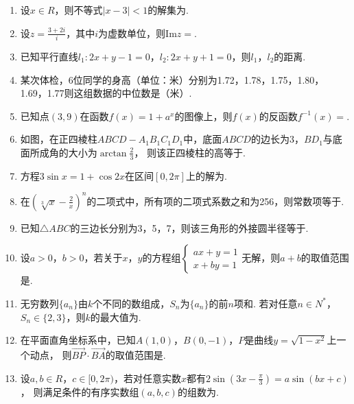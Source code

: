 \documentclass[12pt,space]{ctexart} %
\begin{document}
\begin{enumerate}[itemsep=-0.3em,topsep=0pt]

  \item 设$x\in R$，则不等式$|x-3|<1$的解集为.
  \item 设$\displaystyle{z=\frac{3+2i}{i}}$，其中$i$为虚数单位，则$\text{Im} z=$.
  \item 已知平行直线$l_1: 2x+y-1=0$，$l_2: 2x+y+1=0$，则$l_1$，$l_2$的距离.
  \item 某次体检，6位同学的身高（单位：米）分别为1.72，1.78，1.75，1.80，1.69，1.77则这组数据的中位数是（米）.
  \item 已知点$(3,9)$在函数$f(x)=1+a^x$的图像上，则$f(x)$的反函数$f^{-1}(x)=$.
  \item 如图，在正四棱柱$ABCD-A_1B_1C_1D_1$中，底面$ABCD$的边长为3，$BD_1$与底面所成角的大小为$\displaystyle{\arctan{\frac{2}{3}}}$，
        则该正四棱柱的高等于.
  \item 方程$3\sin x=1+\cos 2x$在区间$[0,2\pi]$上的解为.
  \item 在$\displaystyle{\left (\sqrt[3]{x}-\frac{2}{x}\right )^n}$的二项式中，所有项的二项式系数之和为256，则常数项等于.
  \item 已知$\triangle ABC$的三边长分别为3，5，7，则该三角形的外接圆半径等于.
  \item 设$a>0$，$b>0$，若关于$x$，$y$的方程组$\begin{cases}ax+y=1\\x+by=1\end{cases}$无解，则$a+b$的取值范围是\blank{$[2,+\infty)$}.
  \item 无穷数列$\{a_n\}$由$k$个不同的数组成，$S_n$为$\{a_n\}$的前$n$项和. 若对任意$n\in N^*$，$S_n\in \{2,3\}$，则$k$的最大值为.
  \item 在平面直角坐标系中，已知$A(1,0)$，$B(0,-1)$，$P$是曲线$y=\sqrt{1-x^2}$上一个动点，
        则$\overrightarrow{BP}\cdot \overrightarrow{BA}$的取值范围是\blank{$[0,1+\sqrt{2}]$}.
  \item 设$a,b\in R$，$c\in [0,2\pi)$，若对任意实数$x$都有$\displaystyle{2\sin\left (3x-\frac{\pi}{3}\right )=a\sin(bx+c)}$，
        则满足条件的有序实数组$(a,b,c)$的组数为.


\end{enumerate}
\end{document}
